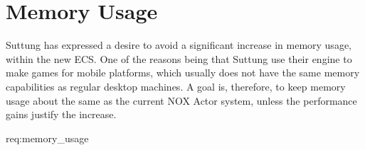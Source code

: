 \section{Memory Usage}
Suttung has expressed a desire to avoid a significant increase in memory usage,
within the new ECS.
One of the reasons being that Suttung use their engine to
make games for mobile platforms, which usually does not have the same memory capabilities as regular desktop machines.
A goal is, therefore, to keep memory usage about the same as the current
NOX Actor system, unless the performance gains justify the increase.

{req:memory_usage}
